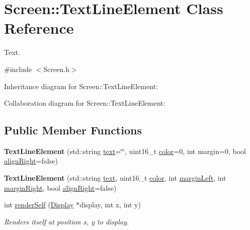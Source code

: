 \hypertarget{classScreen_1_1TextLineElement}{}\section{Screen\+:\+:Text\+Line\+Element Class Reference}
\label{classScreen_1_1TextLineElement}


Text.  




{\ttfamily \#include $<$Screen.\+h$>$}



Inheritance diagram for Screen\+:\+:Text\+Line\+Element\+:


Collaboration diagram for Screen\+:\+:Text\+Line\+Element\+:
\subsection*{Public Member Functions}
\begin{DoxyCompactItemize}
\item 
\mbox{\label{classScreen_1_1TextLineElement_ae0de60080a1c3f6c1be23448927e0717}} 
{\bfseries Text\+Line\+Element} (std\+::string \mbox{\hyperlink{classScreen_1_1TextLineElement_ad2495931e2dd28b0d7cb5d8c761dedad}{text}}=\char`\"{}\char`\"{}, uint16\+\_\+t \mbox{\hyperlink{classScreen_1_1TextLineElement_ac4fa4d52ead8e4b38ba18c673875fae2}{color}}=0, int margin=0, bool \mbox{\hyperlink{classScreen_1_1LineElement_a0c5f4e33c2df1dce8e4e45b90dac1423}{align\+Right}}=false)
\item 
\mbox{\label{classScreen_1_1TextLineElement_ae6f666d60594d487b9c43310c470ec59}} 
{\bfseries Text\+Line\+Element} (std\+::string \mbox{\hyperlink{classScreen_1_1TextLineElement_ad2495931e2dd28b0d7cb5d8c761dedad}{text}}, uint16\+\_\+t \mbox{\hyperlink{classScreen_1_1TextLineElement_ac4fa4d52ead8e4b38ba18c673875fae2}{color}}, int \mbox{\hyperlink{classScreen_1_1LineElement_a9ed23f9510a11334af9be6f53965f7a6}{margin\+Left}}, int \mbox{\hyperlink{classScreen_1_1LineElement_a3a2077f01072be8e8fd0f4539b85beb0}{margin\+Right}}, bool \mbox{\hyperlink{classScreen_1_1LineElement_a0c5f4e33c2df1dce8e4e45b90dac1423}{align\+Right}}=false)
\item 
int \mbox{\hyperlink{classScreen_1_1TextLineElement_abcd2e0700f84bb19d7a285345cd37871}{render\+Self}} (\mbox{\hyperlink{classDisplay}{Display}} $\ast$display, int x, int y)
\begin{DoxyCompactList}\small\item\em Renders itself at position x, y to display. \end{DoxyCompactList}\end{DoxyCompactItemize}
